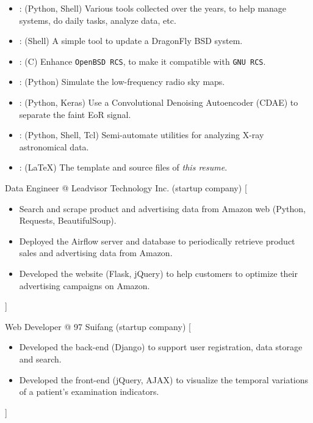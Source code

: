 \documentclass{resume}
\begin{document}
\begin{itemize}
  \item {}:
    (Python, Shell)
    Various tools collected over the years, to help manage systems,
    do daily tasks, analyze data, etc.
  \item {}:
    (Shell)
    A simple tool to update a DragonFly BSD system.
  \item {}:
    (C)
    Enhance \texttt{OpenBSD RCS}, to make it compatible with \texttt{GNU RCS}.
  \item {}:
    (Python)
    Simulate the low-frequency radio sky maps.
  \item {}:
    (Python, Keras)
    Use a Convolutional Denoising Autoencoder (CDAE) to separate the
    faint EoR signal.
  \item {}:
    (Python, Shell, Tcl)
    Semi-automate utilities for analyzing X-ray astronomical data.
  \item {}:
    (\LaTeX)
    The template and source files of \emph{this resume}.
\end{itemize}


\begin{experiences}
    {Data Engineer @ Leadvisor Technology Inc. (startup company)}%
    [\begin{itemize}
      \item Search and scrape product and advertising data from Amazon web
        (Python, Requests, BeautifulSoup).
      \item Deployed the Airflow server and database to periodically
        retrieve product sales and advertising data from Amazon.
      \item Developed the website (Flask, jQuery) to help customers to
        optimize their advertising campaigns on Amazon.
    \end{itemize}]

  \separator{0.5ex}
    {Web Developer @ 97 Suifang (startup company)}%
    [\begin{itemize}
      \item Developed the back-end (Django) to support user registration,
        data storage and search.
      \item Developed the front-end (jQuery, AJAX) to visualize the
        temporal variations of a patient's examination indicators.
    \end{itemize}]
\end{experiences}
\end{document}
